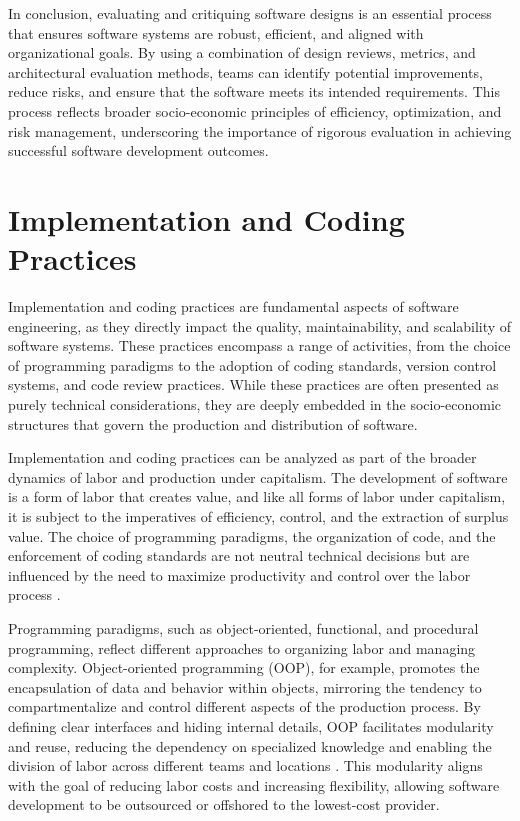 \begin{refsection}
In conclusion, evaluating and critiquing software designs is an essential process that ensures software systems are robust, efficient, and aligned with organizational goals. By using a combination of design reviews, metrics, and architectural evaluation methods, teams can identify potential improvements, reduce risks, and ensure that the software meets its intended requirements. This process reflects broader socio-economic principles of efficiency, optimization, and risk management, underscoring the importance of rigorous evaluation in achieving successful software development outcomes.

\section{Implementation and Coding Practices}

Implementation and coding practices are fundamental aspects of software engineering, as they directly impact the quality, maintainability, and scalability of software systems. These practices encompass a range of activities, from the choice of programming paradigms to the adoption of coding standards, version control systems, and code review practices. While these practices are often presented as purely technical considerations, they are deeply embedded in the socio-economic structures that govern the production and distribution of software.

Implementation and coding practices can be analyzed as part of the broader dynamics of labor and production under capitalism. The development of software is a form of labor that creates value, and like all forms of labor under capitalism, it is subject to the imperatives of efficiency, control, and the extraction of surplus value. The choice of programming paradigms, the organization of code, and the enforcement of coding standards are not neutral technical decisions but are influenced by the need to maximize productivity and control over the labor process \cite[pp.~43-46]{Marx2008}.

Programming paradigms, such as object-oriented, functional, and procedural programming, reflect different approaches to organizing labor and managing complexity. Object-oriented programming (OOP), for example, promotes the encapsulation of data and behavior within objects, mirroring the tendency to compartmentalize and control different aspects of the production process. By defining clear interfaces and hiding internal details, OOP facilitates modularity and reuse, reducing the dependency on specialized knowledge and enabling the division of labor across different teams and locations \cite[pp.~67-70]{Pfleeger2010}. This modularity aligns with the goal of reducing labor costs and increasing flexibility, allowing software development to be outsourced or offshored to the lowest-cost provider.


\end{refsection}
